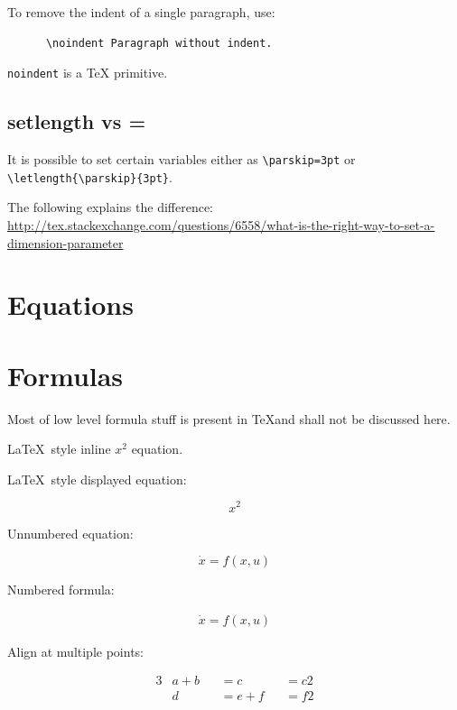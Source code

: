 \documentclass[12pt]{article}
\begin{document}
    To remove the indent of a single paragraph, use:

    \begin{lstlisting}
      \noindent Paragraph without indent.
    \end{lstlisting}

    \lstinline|noindent| is a TeX primitive.

  \subsection{setlength vs =}\label{setlength-vs-eq}

    It is possible to set certain variables either as \lstinline|\parskip=3pt| or \lstinline|\letlength{\parskip}{3pt}|.

    The following explains the difference: \url{http://tex.stackexchange.com/questions/6558/what-is-the-right-way-to-set-a-dimension-parameter}

\section{Equations}\label{equations}

\section{Formulas}\label{formulas}

  Most of low level formula stuff is present in \TeX and shall not be discussed here.

  \LaTeX\ style inline \(x^2\) equation.

  \LaTeX\ style displayed equation:

  \[ x^2 \]

  Unnumbered equation:

  \begin{equation*}
    \dot{x} = f(x,u)
  \end{equation*}

  Numbered formula:

  \begin{equation}\begin{aligned}\label{eqFor1}
    \dot{x} = f(x,u)
  \end{aligned}\end{equation}

  Align at multiple points:

  \begin{alignat*}{3}
    & a + b && = c   && = c2 \\
    & d   && = e + f && = f2
  \end{alignat*}
\end{document}
